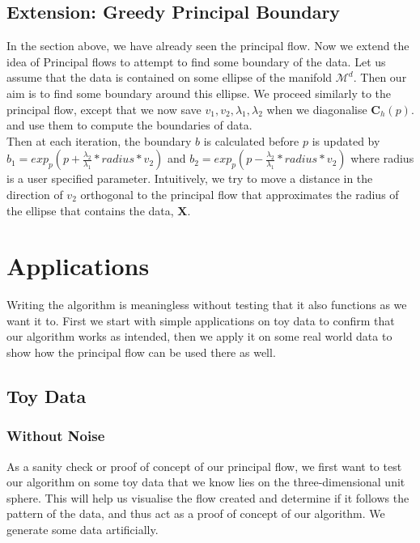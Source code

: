\documentclass[12pt]{report}
\begin{document}
\newpage 
\section{Extension: Greedy Principal Boundary}
In the section above, we have already seen the principal flow.
Now we extend the idea of Principal flows to attempt to find some boundary of the data.
Let us assume that the data is contained on some ellipse of the manifold
$\mathcal{M}^d$. Then our aim is to find some boundary around this ellipse. We proceed 
similarly to the principal flow, except that 
we now save $v_1, v_2, \lambda_1, \lambda_2$
when we diagonalise $\mathbf{C}_{h}(p)$.
and use them to compute the boundaries of data.\\
Then at each iteration, the boundary $b$ is calculated before $p$ 
is updated by $b_1 = exp_p(p + \frac{\lambda_2}{\lambda_1}*radius*v_2)$ and
$b_2 = exp_p(p - \frac{\lambda_2}{\lambda_1}*radius*v_2)$
where radius is a user specified parameter. Intuitively, 
we try to move a distance in the direction of $v_2$ orthogonal to the principal flow
that approximates the radius of the ellipse that contains the data, $\mathbf{X}$.

\chapter{Applications}
Writing the algorithm is meaningless without testing that it also functions 
as we want it to. First we start with simple applications on toy data to confirm that 
our algorithm works as intended, then we apply it on some real world data to show
how the principal flow can be used there as well.

\section{Toy Data}

\subsection{Without Noise}

As a sanity check or proof of concept of our principal flow, 
we first want to test our algorithm on some toy data that we know 
lies on the three-dimensional unit sphere. This will help us visualise the flow created
and determine if it follows the pattern of the data, 
and thus act as a proof of concept of
our algorithm. We generate some data artificially.
\end{document}
